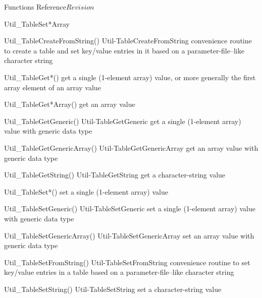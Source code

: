 \begin{cactuspart}{ Functions Reference}{}{$Revision$}
\begin{FunctionDescription}{Util\_TableSet*Array}
\begin{SeeAlsoSection}
\begin{SeeAlso2} {Util\_TableCreateFromString()} {Util-TableCreateFromString}
convenience routine to create a table and set key/value entries
in it based on a parameter-file--like character string
\end{SeeAlso2}
\begin{SeeAlso}{Util\_TableGet*()}
get a single (1-element array) value,
or more generally the first array element of an array value
\end{SeeAlso}
\begin{SeeAlso}{Util\_TableGet*Array()}
get an array value
\end{SeeAlso}
\begin{SeeAlso2} {Util\_TableGetGeneric()} {Util-TableGetGeneric}
get a single (1-element array) value with generic data type
\end{SeeAlso2}
\begin{SeeAlso2} {Util\_TableGetGenericArray()} {Util-TableGetGenericArray}
get an array value with generic data type
\end{SeeAlso2}
\begin{SeeAlso2} {Util\_TableGetString()} {Util-TableGetString}
get a character-string value
\end{SeeAlso2}
\begin{SeeAlso}{Util\_TableSet*()}
set a single (1-element array) value
\end{SeeAlso}
\begin{SeeAlso2} {Util\_TableSetGeneric()} {Util-TableSetGeneric}
set a single (1-element array) value with generic data type
\end{SeeAlso2}
\begin{SeeAlso2} {Util\_TableSetGenericArray()} {Util-TableSetGenericArray}
set an array value with generic data type
\end{SeeAlso2}
\begin{SeeAlso2} {Util\_TableSetFromString()} {Util-TableSetFromString}
convenience routine to set key/value entries in a table based on a
parameter-file--like character string
\end{SeeAlso2}
\begin{SeeAlso2} {Util\_TableSetString()} {Util-TableSetString}
set a character-string value
\end{SeeAlso2}
\end{SeeAlsoSection}


\end{FunctionDescription}
\end{cactuspart}
